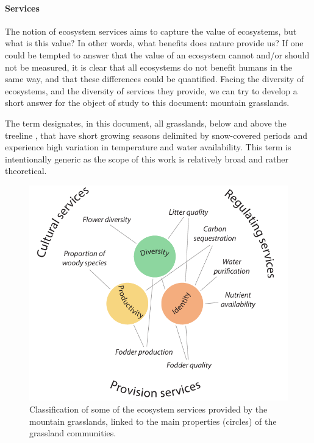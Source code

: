 \paragraph{Services}
The notion of ecosystem services aims to capture the value of ecosystems, but what is this value? In other words, what benefits does nature provide us? If one could be tempted to answer that the value of an ecosystem cannot and/or should not be measured, it is clear that all ecosystems do not benefit humans in the same way, and that these differences could be quantified. Facing the diversity of ecosystems, and the diversity of services they provide, we can try to develop a short answer for the object of study to this document: mountain grasslands.

The term  designates, in this document, all grasslands, below and above the treeline , that have short growing seasons delimited by snow-covered periods and experience high variation in temperature and water availability. This term is intentionally generic as the scope of this work is relatively broad and rather theoretical.

\begin{figure}
    \includegraphics[width=1\linewidth]{./1_Introduction/graphics/services.pdf}
  \caption[Ecosystem services in mountain grasslands]{Classification of some of the ecosystem services provided by the mountain grasslands, linked to the main properties (circles) of the grassland communities. }
  \label{fig:services}
\end{figure}

